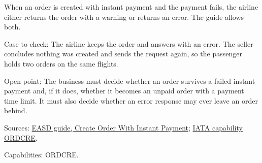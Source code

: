 \begin{definition}
  \label{def:order-creation-instant-payment-failure}
  \notready
  When an order is created with instant payment and the payment fails, the
  airline either returns the order with a warning or returns an error. The
  guide allows both.

  Case to check: The airline keeps the order and answers with an error. The
  seller concludes nothing was created and sends the request again, so the
  passenger holds two orders on the same flights.

  Open point: The business must decide whether an order survives a failed
  instant payment and, if it does, whether it becomes an unpaid order with a
  payment time limit. It must also decide whether an error response may ever
  leave an order behind.

  Sources: \href{https://standards.atlassian.net/wiki/spaces/EASD/pages/574619727/Create+Order+With+Instant+Payment}{EASD guide, Create Order With Instant Payment};
  \href{https://retailing.iata.org/armi/docs/ORDCRE/}{IATA capability ORDCRE}.

  Capabilities: ORDCRE.
\end{definition}

